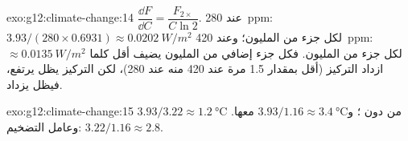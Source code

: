 \begin{solution}{exo:g12:climate-change:14}
$\dfrac{\dd F}{\dd C} = \dfrac{F_{2\times}}{C \ln 2}$. عند \qty{280}{ppm}:
$3.93/(280 \times 0.6931) \approx \qty{0.0202}{W/m^2}$ لكل جزء من المليون؛ وعند
\qty{420}{ppm}: $\approx \qty{0.0135}{W/m^2}$ لكل جزء من المليون. فكل جزء إضافي من المليون يضيف
 أقل كلما ازداد التركيز (أقل بمقدار 1.5 مرة عند 420 منه عند 280)،
لكن التركيز يظل يرتفع، فيظل  يزداد.
\end{solution}

\begin{solution}{exo:g12:climate-change:15}
$3.93/3.22 \approx \qty{1.2}{\degreeCelsius}$ من دون ؛
و$3.93/1.16 \approx \qty{3.4}{\degreeCelsius}$ معها. وعامل
التضخيم: $3.22/1.16 \approx 2.8$.
\end{solution}

